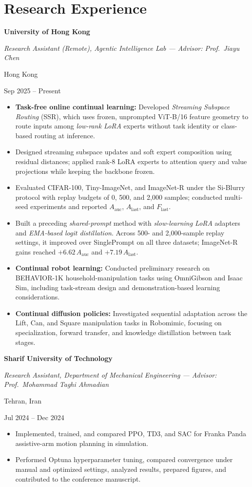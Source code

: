 \documentclass[10pt,letterpaper]{article}
\newcommand{\cvhead}[4]{%
  \par\vspace{3.5pt}%
  \noindent
  \begin{minipage}[t]{0.75\textwidth}
    \textbf{#1}\par
    \textit{#2}%
  \end{minipage}%
  \hfill
  \begin{minipage}[t]{0.23\textwidth}
    \raggedleft #3\par
    \raggedleft #4%
  \end{minipage}\par
  \vspace{1pt}%
}
\begin{document}
\section{Research Experience}
\cvhead{University of Hong Kong}{Research Assistant (Remote), Agentic Intelligence Lab --- Advisor: Prof.\ Jiayu Chen}{Hong Kong}{Sep 2025 -- Present}
\begin{itemize}
  \item \textbf{Task-free online continual learning:} Developed \textit{Streaming Subspace Routing} (SSR), which uses frozen, unprompted ViT-B/16 feature geometry to route inputs among \textit{low-rank LoRA} experts without task identity or class-based routing at inference.
  \item Designed streaming subspace updates and soft expert composition using residual distances; applied rank-8 LoRA experts to attention query and value projections while keeping the backbone frozen.
  \item Evaluated CIFAR-100, Tiny-ImageNet, and ImageNet-R under the Si-Blurry protocol with replay budgets of 0, 500, and 2,000 samples; conducted multi-seed experiments and reported $A_{\mathrm{auc}}$, $A_{\mathrm{last}}$, and $F_{\mathrm{last}}$.
  \item Built a preceding \textit{shared-prompt} method with \textit{slow-learning LoRA} adapters and \textit{EMA-based logit distillation}. Across 500- and 2,000-sample replay settings, it improved over SinglePrompt on all three datasets; ImageNet-R gains reached $+6.62\,A_{\mathrm{auc}}$ and $+7.19\,A_{\mathrm{last}}$.
  \item \textbf{Continual robot learning:} Conducted preliminary research on BEHAVIOR-1K household-manipulation tasks using OmniGibson and Isaac Sim, including task-stream design and demonstration-based learning considerations.
  \item \textbf{Continual diffusion policies:} Investigated sequential adaptation across the Lift, Can, and Square manipulation tasks in Robomimic, focusing on specialization, forward transfer, and knowledge distillation between task stages.
\end{itemize}

\cvhead{Sharif University of Technology}{Research Assistant, Department of Mechanical Engineering --- Advisor: Prof.\ Mohammad Taghi Ahmadian}{Tehran, Iran}{Jul 2024 -- Dec 2024}
\begin{itemize}
  \item Implemented, trained, and compared PPO, TD3, and SAC for Franka Panda assistive-arm motion planning in simulation.
  \item Performed Optuna hyperparameter tuning, compared convergence under manual and optimized settings, analyzed results, prepared figures, and contributed to the conference manuscript.
\end{itemize}
\end{document}
